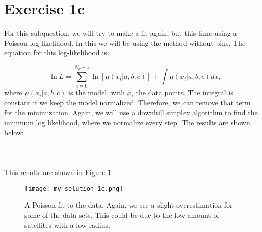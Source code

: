 \section{Exercise 1c}

For this subquestion, we will try to make a fit again, but this time using a Poisson log-likelihood. In this we will be using the method without bins. The equation for this log-likelihood is: 

\begin{equation}
    -\ln{L} = \sum^{N_p-1}_{i = 0} \ln{[\mu(x_i|a,b,c)] + \int \mu(x_i|a,b,c) dx}, 
\end{equation}
where $\mu(x_i|a,b,c)$ is the model, with $x_i$ the data points. The integral is constant if we keep the model normalized. Therefore, we can remove that term for the minimization. Again, we will use a downhill simplex algorithm to find the minimum log likelihood, where we normalize every step. The results are shown below: 
\\
\\

\\
\\
This results are shown in Figure \ref{fig:1c}

\begin{figure}[h!]
  \centering
  \texttt{[image: my\_solution\_1c.png]}
  \caption{A Poisson fit to the data. Again, we see a slight overestimation for some of the data sets. This could be due to the low amount of satellites with a low radius.}
  \label{fig:1c}
\end{figure}
